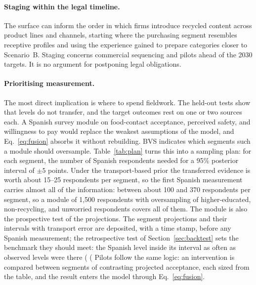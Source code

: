 \paragraph{Staging within the legal timeline.}
The surface can inform the order in which firms introduce recycled content
across product lines and channels, starting where the purchasing segment
resembles receptive profiles and using the experience gained to prepare
categories closer to Scenario~B. Staging concerns commercial sequencing and
pilots ahead of the 2030 targets. It is no argument for postponing legal
obligations.

\paragraph{Prioritising measurement.}
The most direct implication is where to spend fieldwork. The held-out tests
show that levels do not transfer, and the target outcomes rest on one or two
sources each. A Spanish survey module on food-contact acceptance, perceived
safety, and willingness to pay would replace the weakest assumptions of the
model, and Eq.~\eqref{eq:fusion} absorbs it without rebuilding. BVS indicates
which segments such a module should oversample. Table~\ref{tab:plan} turns this
into a sampling plan: for each segment, the number of Spanish respondents
needed for a 95\% posterior interval of $\pm 5$ points. Under the
transport-based prior the transferred evidence is worth about 15--25
respondents per segment, so the first Spanish measurement carries almost all of
the information: between about 100 and 370 respondents per segment, so a module
of 1{,}500 respondents with oversampling of higher-educated, non-recycling, and
unworried respondents covers all of them.
The module is also the prospective test of the projections. The segment
projections and their intervals with transport error are deposited, with a
time stamp, before any Spanish measurement; the retrospective test of
Section~\ref{sec:backtest} sets the benchmark they should meet: the Spanish
level inside its interval as often as observed levels were there
(%
(%
Pilots follow the same logic: an intervention is compared between segments of
contrasting projected acceptance, each sized from the table, and the result
enters the model through Eq.~\eqref{eq:fusion}.

